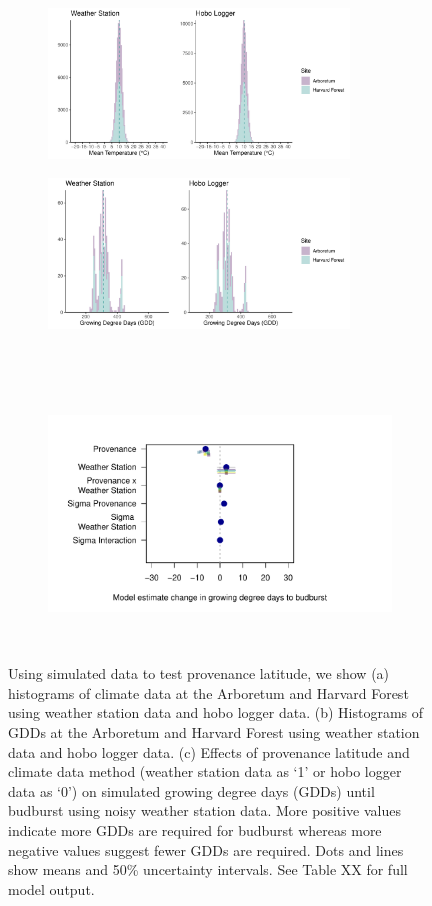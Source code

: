 \documentclass{article}\usepackage[]{graphicx}\usepackage[]{color}
\begin{document}
\begin{figure}
  \begin{subfigure}{.5\linewidth}
    \caption{}
    \centering
    \includegraphics[height=4cm, width=8cm]{..//analyses/figures/clim_methods_prov.pdf}
    \label{fig:climprov}
  \end{subfigure}%
    \begin{subfigure}{.5\linewidth}
      \caption{}
      \centering
      \includegraphics[height=4cm, width=8cm]{..//analyses/figures/gdd_methods_prov.pdf}
    \label{fig:gddprov}
  \end{subfigure}\\[1ex]
  \begin{subfigure}{\linewidth}
	    \caption{}
      \centering
      \includegraphics[height=7cm, width=11cm]{..//analyses/figures/muplot_prov.pdf}
      \label{fig:muplotprov}
  \end{subfigure}
\caption{ Using simulated data to test provenance latitude, we show (a) histograms of climate data at the Arboretum and Harvard Forest using weather station data and hobo logger data. (b) Histograms of GDDs at the Arboretum and Harvard Forest using weather station data and hobo logger data. (c) Effects of provenance latitude and climate data method (weather station data as `1' or hobo logger data as `0') on simulated growing degree days (GDDs) until budburst using noisy weather station data. More positive values indicate more GDDs are required for budburst whereas more negative values suggest fewer GDDs are required. Dots and lines show means and 50\% uncertainty intervals. See Table XX for full model output.}

\end{figure}
\end{document}
